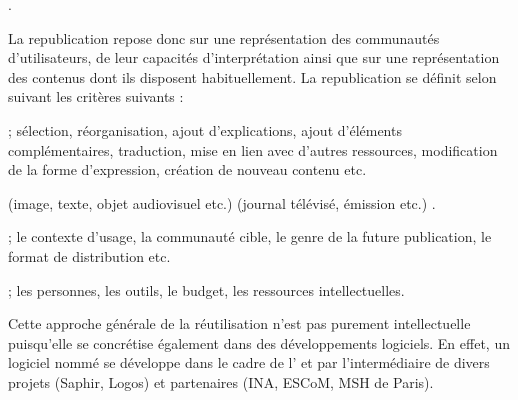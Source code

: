 \parencite{Stockinger2007b}.

La republication repose donc sur une représentation des communautés d'utilisateurs, de leur capacités d'interprétation ainsi que sur une représentation des contenus dont ils disposent habituellement. 
La republication se définit selon \parencite{Stockinger2007} suivant les critères suivants : 
\begin{liste}
	\item {} ; sélection, réorganisation, ajout d'explications, ajout d'éléments complémentaires, traduction, mise en lien avec d'autres ressources, modification de la forme d'expression, création de nouveau contenu etc.
	\item {} (image, texte, objet audiovisuel etc.)  (journal télévisé, émission etc.) . 
	\item {} ; le contexte d'usage, la communauté cible, le genre de la future publication, le format de distribution etc.
	\item {} ; les personnes, les outils, le budget, les ressources intellectuelles.
\end{liste}
Cette approche générale de la réutilisation n'est pas purement intellectuelle puisqu'elle se concrétise également dans des développements logiciels. 
En effet, un logiciel nommé  se développe dans le cadre de l' et par l'intermédiaire de divers projets (Saphir, Logos) et partenaires (INA, ESCoM, MSH de Paris).

